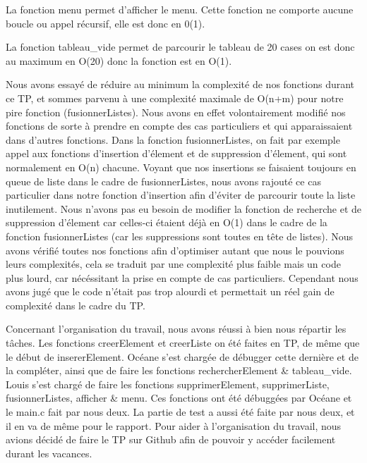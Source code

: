 \documentclass[11pt]{report}
\begin{document}
La fonction menu permet d'afficher le menu. Cette fonction ne comporte aucune boucle ou appel récursif, elle est donc en 0(1).

\medskip

La fonction tableau\_vide permet de parcourir le tableau de 20 cases on est donc au maximum en O(20) donc la fonction est en O(1).

\medskip

Nous avons essayé de réduire au minimum la complexité de nos fonctions durant ce TP, et sommes parvenu à une complexité maximale de O(n+m) pour notre pire fonction (fusionnerListes). Nous avons en effet volontairement modifié nos fonctions de sorte à prendre en compte des cas particuliers et qui apparaissaient dans d'autres fonctions. Dans la fonction fusionnerListes, on fait par exemple appel aux fonctions d'insertion d'élement et de suppression d'élement, qui sont normalement en O(n) chacune. Voyant que nos insertions se faisaient toujours en queue de liste dans le cadre de fusionnerListes, nous avons rajouté ce cas particulier dans notre fonction d'insertion afin d'éviter de parcourir toute la liste inutilement. Nous n'avons pas eu besoin de modifier la fonction de recherche et de suppression d'élement car celles-ci étaient déjà en O(1) dans le cadre de la fonction fusionnerListes (car les suppressions sont toutes en tête de listes). Nous avons vérifié toutes nos fonctions afin d'optimiser autant que nous le pouvions leurs complexités, cela se traduit par une complexité plus faible mais un code plus lourd, car nécéssitant la prise en compte de cas particuliers. Cependant nous avons jugé que le code n'était pas trop alourdi et permettait un réel gain de complexité dans le cadre du TP.

\medskip

Concernant l'organisation du travail, nous avons réussi à bien nous répartir les tâches. Les fonctions creerElement et creerListe on été faites en TP, de même que le début de insererElement. Océane s'est chargée de débugger cette dernière et de la compléter, ainsi que de faire les fonctions rechercherElement & tableau\_vide. Louis s'est chargé de faire les fonctions supprimerElement, supprimerListe, fusionnerListes, afficher & menu. Ces fonctions ont été débuggées par Océane et le main.c fait par nous deux. La partie de test a aussi été faite par nous deux, et il en va de même pour le rapport.
Pour aider à l'organisation du travail, nous avions décidé de faire le TP sur Github afin de pouvoir y accéder facilement durant les vacances.
\end{document}
